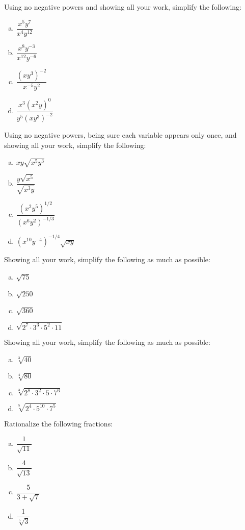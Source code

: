 \documentclass[11pt,letterpaper]{article}
\begin{document}
\newpage



 Using no negative powers and showing all your work, simplify the following:
        \begin{enumerate}[(a)]
        \item $\dfrac{x^5 y^7}{x^4 y^{12}}$
        \item $\dfrac{x^8 y^{-3}}{x^{12} y^{-6}}$
        \item $\dfrac{(xy^3)^{-2}}{x^{-5} y^2}$
        \item $\dfrac{x^3 (x^2y)^0}{y^5(xy^3)^{-2}}$
        \end{enumerate}



\newpage



 Using no negative powers, being sure each variable appears only once, and showing all your work, simplify the following:
        \begin{enumerate}[(a)]
        \item $xy\sqrt{x^5y^3}$
        \item $\dfrac{y \sqrt{x^5}}{\sqrt{x^3y}}$
        \item $\dfrac{(x^2 y^5)^{1/2}}{(x^6 y^{2})^{-1/3}}$
        \item $(x^{10} y^{-4})^{-1/4} \sqrt{xy}$
        \end{enumerate}



\newpage



 Showing all your work, simplify the following as much as possible:
        \begin{enumerate}[(a)]
        \item $\sqrt{75}$
        \item $\sqrt{250}$
        \item $\sqrt{360}$
        \item $\sqrt{2^7 \cdot 3^3 \cdot 5^2 \cdot 11}$
        \end{enumerate}



\newpage



 Showing all your work, simplify the following as much as possible:
        \begin{enumerate}[(a)]
        \item $\sqrt[3]{40}$
        \item $\sqrt[4]{80}$
        \item $\sqrt[3]{2^8 \cdot 3^2 \cdot 5 \cdot 7^6}$
        \item $\sqrt[5]{2^4 \cdot 5^{10} \cdot 7^5}$
        \end{enumerate}



\newpage



 Rationalize the following fractions:
        \begin{enumerate}[(a)]
        \item $\dfrac{1}{\sqrt{11}}$
        \item $\dfrac{4}{\sqrt{13}}$
        \item $\dfrac{5}{3 + \sqrt{7}}$
        \item $\dfrac{1}{\sqrt[5]{3}}$
        \end{enumerate}
\end{document}
